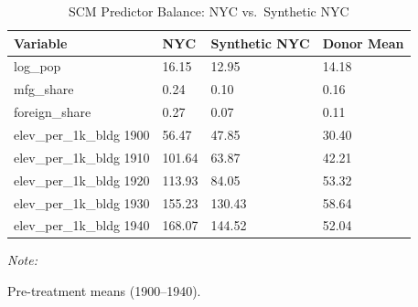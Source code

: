 \begin{table}[!h]
\centering
\caption{SCM Predictor Balance: NYC vs.~Synthetic NYC}
\centering
\begin{threeparttable}
\begin{tabular}[t]{llll}
\toprule
Variable & NYC & Synthetic NYC & Donor Mean\\
\midrule
log\_pop & 16.15 & 12.95 & 14.18\\
mfg\_share & 0.24 & 0.10 & 0.16\\
foreign\_share & 0.27 & 0.07 & 0.11\\
elev\_per\_1k\_bldg 1900 & 56.47 & 47.85 & 30.40\\
elev\_per\_1k\_bldg 1910 & 101.64 & 63.87 & 42.21\\
\addlinespace
elev\_per\_1k\_bldg 1920 & 113.93 & 84.05 & 53.32\\
elev\_per\_1k\_bldg 1930 & 155.23 & 130.43 & 58.64\\
elev\_per\_1k\_bldg 1940 & 168.07 & 144.52 & 52.04\\
\bottomrule
\end{tabular}
\begin{tablenotes}
\item \textit{Note: } 
\item Pre-treatment means (1900--1940).
\end{tablenotes}
\end{threeparttable}
\end{table}
